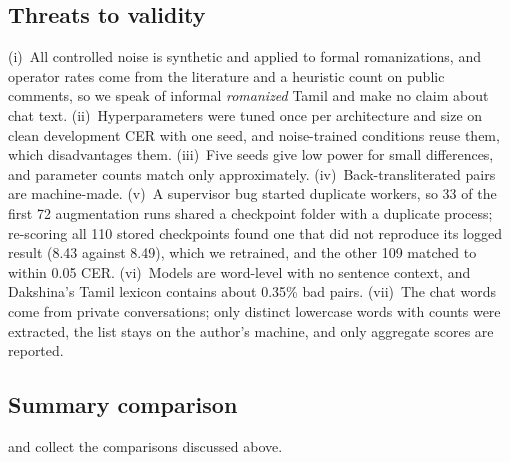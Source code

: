 \documentclass[conference]{IEEEtran}
\begin{document}
\subsection{Threats to validity}
(i)~All controlled noise is synthetic and applied to formal romanizations, and operator rates come from the literature and a heuristic count on public comments, so we speak of informal \emph{romanized} Tamil and make no claim about chat text.
(ii)~Hyperparameters were tuned once per architecture and size on clean development CER with one seed, and noise-trained conditions reuse them, which disadvantages them.
(iii)~Five seeds give low power for small differences, and parameter counts match only approximately.
(iv)~Back-transliterated pairs are machine-made.
(v)~A supervisor bug started duplicate workers, so 33 of the first 72 augmentation runs shared a checkpoint folder with a duplicate process; re-scoring all 110 stored checkpoints found one that did not reproduce its logged result (8.43 against 8.49), which we retrained, and the other 109 matched to within 0.05 CER.
(vi)~Models are word-level with no sentence context, and Dakshina's Tamil lexicon contains about 0.35\% bad pairs.
(vii)~The chat words come from private conversations; only distinct lowercase words with counts were extracted, the list stays on the author's machine, and only aggregate scores are reported.

\subsection{Summary comparison}
 and  collect the comparisons discussed above.

\begin{table}[t]
\caption{Clean results (mean $\pm$ sd over five seeds). Dev and test CER in \%, beam 10; top-1 and top-5 are test accuracies. Bold: lowest test CER.}
\label{tab:c3}
\centering\scriptsize
\setlength{\tabcolsep}{3pt}
\resizebox{\columnwidth}{!}{}
\end{table}

\begin{table}[t]
\caption{Paired bootstrap over 6{,}833 test items (10{,}000 resamples). $\Delta$CER = CER($a$) $-$ CER($b$); negative favours $a$. Intervals that exclude zero are real for this test set, not necessarily for the population of trained models.}
\label{tab:stats}
\centering\scriptsize
\resizebox{\columnwidth}{!}{}
\end{table}
\end{document}
